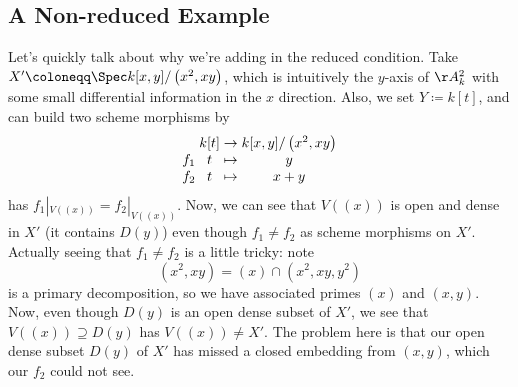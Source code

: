\documentclass[../notes.tex]{subfiles}
\begin{document}
\subsection{A Non-reduced Example}
Let's quickly talk about why we're adding in the reduced condition. Take $X'\coloneqq\Spec k[x,y]/\left(x^2,xy\right)$, which is intuitively the $y$-axis of $\AA^2_k$ with some small differential information in the $x$ direction. Also, we set $Y\coloneqq k[t]$, and can build two scheme morphisms by
\[\arraycolsep=1.4pt\begin{array}{cccc}
	& k[t] &\to& k[x,y]/\left(x^2,xy\right) \\
	f_1 & t &\mapsto& y  \\
	f_2 & t &\mapsto& x+y
\end{array}\]
has $f_1|_{V((x))}=f_2|_{V((x))}$. Now, we can see that $V((x))$ is open and dense in $X'$ (it contains $D(y)$) even though $f_1\ne f_2$ as scheme morphisms on $X'$. Actually seeing that $f_1\ne f_2$ is a little tricky: note
\[\left(x^2,xy\right)=(x)\cap\left(x^2,xy,y^2\right)\]
is a primary decomposition, so we have associated primes $(x)$ and $(x,y)$. Now, even though $D(y)$ is an open dense subset of $X'$, we see that $V((x))\supseteq D(y)$ has $V((x))\ne X'$. The problem here is that our open dense subset $D(y)$ of $X'$ has missed a closed embedding from $(x,y)$, which our $f_2$ could not see.
\end{document}
